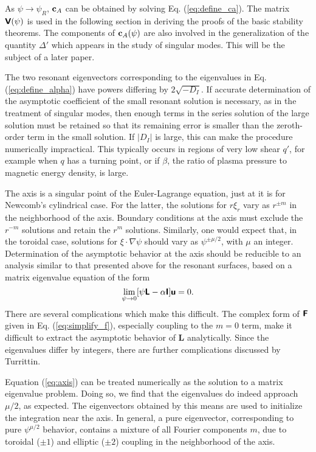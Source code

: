 \documentclass[prb,twocolumn,showpacs,preprintnumbers,amsmath,amssymb]{revtex4}
\renewcommand*{\v}[1]{\hbox{\bfseries #1}}
\renewcommand*{\t}[1]{\hbox{\sffamily\bfseries #1}}
\begin{document}
As $\psi \to \psi_R$, $\v{c}_A$ can be obtained by solving
Eq. (\ref{eq:define_ca}).  The matrix $\t{V}(\psi)$ is used in the
following section in deriving the proofs of the basic stability
theorems.  The components of $\v{c}_A(\psi)$ are also involved in the
generalization of the quantity $\Delta'$ which appears in the study of
singular modes.  This will be the subject of a later paper.

The two resonant eigenvectors corresponding to the eigenvalues in
Eq. (\ref{eq:define_alpha}) have powers differing by $2 \sqrt{-D_I}$.
If accurate determination of the asymptotic coefficient of the small
resonant solution is necessary, as in the treatment of singular modes,
then enough terms in the series solution of the large solution must be
retained so that its remaining error is smaller than the zeroth-order
term in the small solution.  If $|D_I|$ is large, this can make the
procedure numerically impractical.  This typically occurs in regions of
very low shear $q'$, for example when $q$ has a turning point, or if
$\beta$, the ratio of plasma pressure to magnetic energy density, is
large.

The axis is a singular point of the Euler-Lagrange equation, just at it
is for Newcomb's cylindrical case.  For the latter, the solutions for $r
\xi_r$ vary as $r^{\pm m}$ in the neighborhood of the axis.  Boundary
conditions at the axis must exclude the $r^{-m}$ solutions and retain
the $r^{m}$ solutions.  Similarly, one would expect that, in the
toroidal case, solutions for $\xi \cdot \nabla \psi$ should vary as
$\psi^{\pm \mu/2}$, with $\mu$ an integer.  Determination of the
asymptotic behavior at the axis should be reducible to an analysis
similar to that presented above for the resonant surfaces, based on a
matrix eigenvalue equation of the form
\begin{equation}
\lim_{\psi \to 0} [ \psi \t{L} - \alpha \t{I} ] \t{u} = 0.
\label{eq:axis}
\end{equation}
There are several complications which make this difficult.  The complex
form of $\t{F}$ given in Eq. (\ref{eq:simplify_f}), especially coupling
to the $m=0$ term, make it difficult to extract the asymptotic behavior
of \t{L} analytically.  Since the eigenvalues differ by integers, there
are further complications discussed by Turrittin.

Equation (\ref{eq:axis}) can be treated numerically as the solution to a
matrix eigenvalue problem.  Doing so, we find that the eigenvalues do
indeed approach $\mu/2$, as expected.  The eigenvectors obtained by this
means are used to initialize the integration near the axis.  In general,
a pure eigenvector, corresponding to pure $\psi^{\mu/2}$ behavior,
contains a mixture of all Fourier components $m$, due to toroidal ($\pm
1$) and elliptic ($\pm 2$) coupling in the neighborhood of the axis.
\end{document}

